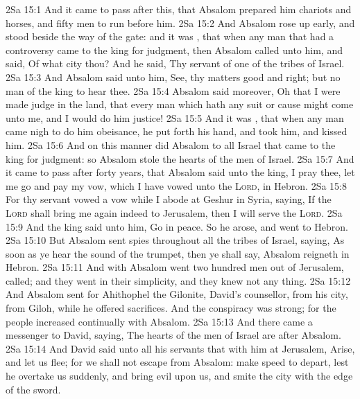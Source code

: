 \vs 2Sa 15:1 And it came to pass after this, that Absalom prepared him chariots and horses, and fifty men to run before him.
\vs 2Sa 15:2 And Absalom rose up early, and stood beside the way of the gate: and it was , that when any man that had a controversy came to the king for judgment, then Absalom called unto him, and said, Of what city  thou? And he said, Thy servant  of one of the tribes of Israel.
\vs 2Sa 15:3 And Absalom said unto him, See, thy matters  good and right; but  no man  of the king to hear thee.
\vs 2Sa 15:4 Absalom said moreover, Oh that I were made judge in the land, that every man which hath any suit or cause might come unto me, and I would do him justice!
\vs 2Sa 15:5 And it was , that when any man came nigh  to do him obeisance, he put forth his hand, and took him, and kissed him.
\vs 2Sa 15:6 And on this manner did Absalom to all Israel that came to the king for judgment: so Absalom stole the hearts of the men of Israel.
\vs 2Sa 15:7 And it came to pass after forty years, that Absalom said unto the king, I pray thee, let me go and pay my vow, which I have vowed unto the \textsc{Lord}, in Hebron.
\vs 2Sa 15:8 For thy servant vowed a vow while I abode at Geshur in Syria, saying, If the \textsc{Lord} shall bring me again indeed to Jerusalem, then I will serve the \textsc{Lord}.
\vs 2Sa 15:9 And the king said unto him, Go in peace. So he arose, and went to Hebron.
\vs 2Sa 15:10 But Absalom sent spies throughout all the tribes of Israel, saying, As soon as ye hear the sound of the trumpet, then ye shall say, Absalom reigneth in Hebron.
\vs 2Sa 15:11 And with Absalom went two hundred men out of Jerusalem,  called; and they went in their simplicity, and they knew not any thing.
\vs 2Sa 15:12 And Absalom sent for Ahithophel the Gilonite, David's counsellor, from his city,  from Giloh, while he offered sacrifices. And the conspiracy was strong; for the people increased continually with Absalom.
\vs 2Sa 15:13 And there came a messenger to David, saying, The hearts of the men of Israel are after Absalom.
\vs 2Sa 15:14 And David said unto all his servants that  with him at Jerusalem, Arise, and let us flee; for we shall not  escape from Absalom: make speed to depart, lest he overtake us suddenly, and bring evil upon us, and smite the city with the edge of the sword.
